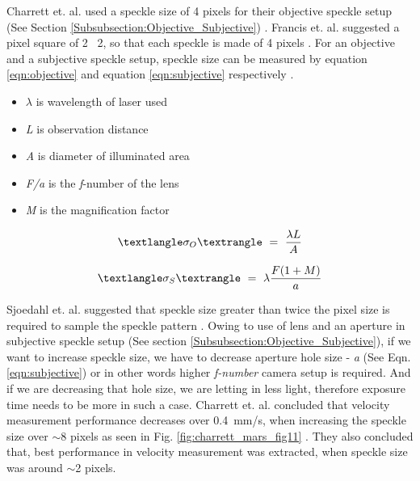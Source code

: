     \vspace{5mm}

    \noindent Charrett et. al. used a speckle size of 4 pixels for their objective speckle setup (See Section \ref{Subsubsection:Objective_Subjective}) \cite{charrett_2019}. Francis et. al. suggested a pixel square of 2 \times \ 2, so that each speckle is made of 4 pixels \cite{francis_autonomous}. For an objective and a subjective speckle setup, speckle size can be measured by equation \ref{eqn:objective} and equation \ref{eqn:subjective} respectively \cite{cloud}. 
    
    \vspace{5mm}
    \begin{itemize}
        \item $\lambda$ is wavelength of laser used
        \item \emph{L} is observation distance
        \item \emph{A} is diameter of illuminated area
        \item \emph{F/a} is the \emph{f}-number of the lens
        \item \emph{M} is the magnification factor
    \end{itemize}

    \begin{equation}\label{eqn:objective}
        \textlangle \sigma_O \textrangle \ = \  \frac{\lambda L}{A}
    \end{equation}

    \begin{equation}\label{eqn:subjective}
        \textlangle \sigma_S \textrangle \ = \  \lambda \frac{F(1 + M)}{a}
    \end{equation}

    \vspace{5mm}

    \noindent Sjoedahl et. al. suggested that speckle size greater than twice the pixel size is required to sample the speckle pattern \cite{sjoedahl}. Owing to use of lens and an aperture in subjective speckle setup (See section \ref{Subsubsection:Objective_Subjective}), if we want to increase speckle size, we have to decrease aperture hole size - \emph{a} (See Eqn. \ref{eqn:subjective}) or in other words higher \emph{f-number} camera setup is required. And if we are decreasing that hole size, we are letting in less light, therefore exposure time needs to be more in such a case. Charrett et. al. concluded that velocity measurement performance decreases over \SI{0.4}{\milli\meter/\second}, when increasing the speckle size over $\sim$8 pixels as seen in Fig. \ref{fig:charrett_mars_fig11} \cite{charrett_mars}. They also concluded that, best performance in velocity measurement was extracted, when speckle size was around $\sim$2 pixels.


